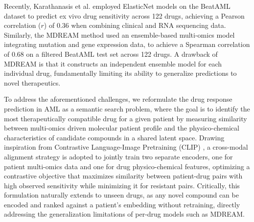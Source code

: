 \documentclass[sigconf,authordraft]{acmart}
\begin{document}
Recently, Karathanasis et al. \cite{karathanasis2024combining} employed ElasticNet models on the BeatAML dataset to predict ex vivo drug sensitivity across 122 drugs, achieving a Pearson correlation ($r$) of $0.36$ when combining clinical and RNA sequencing data. Similarly, the MDREAM method \cite{trac2023prediction} used an ensemble-based multi-omics model integrating mutation and gene expression data, to achieve a Spearman correlation of $0.68$ on a filtered BeatAML test set across 122 drugs. A drawback of MDREAM is that it constructs an independent ensemble model for each individual drug, fundamentally limiting its ability to generalize predictions to novel therapeutics.

To address the aforementioned challenges, we reformulate the drug response prediction in AML as a semantic search problem, where the goal is to identify the most therapeutically compatible drug for a given patient by measuring similarity between multi-omics driven molecular patient profile and the physico-chemical characteristics of candidate compounds in a shared latent space. Drawing inspiration from Contrastive Language-Image Pretraining (CLIP) \cite{radford2021learning}, a cross-modal alignment strategy is adopted to jointly train two separate encoders, one for patient multi-omics data and one for drug physico-chemical features, optimizing a contrastive objective that maximizes similarity between patient-drug pairs with high observed sensitivity while minimizing it for resistant pairs. Critically, this formulation naturally extends to unseen drugs, as any novel compound can be encoded and ranked against a patient's embedding without retraining, directly addressing the generalization limitations of per-drug models such as MDREAM.
\end{document}
